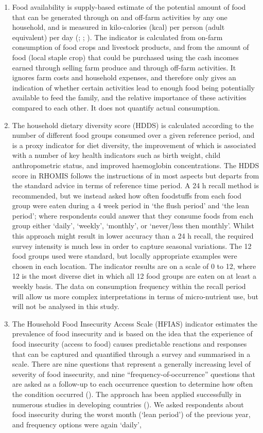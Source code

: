 \begin{enumerate}[label=\arabic*., start = 1]
\item Food availability is supply-based estimate of the potential amount of food that can be generated through on and off-farm activities by any one household, and is measured in kilo-calories (kcal) per person (adult equivalent) per day (\citealp{Frelat2016458}; \citealp{Ritzema2017}; \citealp{VanWijk2014a}). The indicator is calculated from on-farm consumption of food crops and livestock products, and from the amount of food (local staple crop) that could be purchased using the cash incomes earned through selling farm produce and through off-farm activities. It ignores farm costs and household expenses, and therefore only gives an indication of whether certain activities lead to enough food being potentially available to feed the family, and the relative importance of these activities compared to each other. It does not quantify actual consumption.
\item The household dietary diversity score (HDDS) is calculated according to the number of different food groups consumed over a given reference period, and is a proxy indicator for diet diversity, the improvement of which is associated with a number of key health indicators such as birth weight, child anthropometric status, and improved haemoglobin concentrations. The HDDS score in RHOMIS follows the instructions of \citet{Swindale2006} in most aspects but departs from the standard advice in terms of reference time period. A 24 h recall method is recommended, but we instead asked how often foodstuffs from each food group were eaten during a 4 week period in `the flush period' and `the lean period'; where respondents could answer that they consume foods from each group either `daily', `weekly', `monthly', or `never/less then monthly'. Whilst this approach might result in lower accuracy than a 24 h recall, the required survey intensity is much less in order to capture seasonal variations. The 12 food groups used were standard, but locally appropriate examples were chosen in each location. The indicator results are on a scale of 0 to 12, where 12 is the most diverse diet in which all 12 food groups are eaten on at least a weekly basis. The data on consumption frequency within the recall period will allow us more complex interpretations in terms of micro-nutrient use, but will not be analysed in this study.
\item The Household Food Insecurity Access Scale (HFIAS) indicator estimates the prevalence of food insecurity and is based on the idea that the experience of food insecurity (access to food) causes predictable reactions and responses that can be captured and quantiﬁed through a survey and summarised in a scale. There are nine questions that represent a generally increasing level of severity of food insecurity, and nine “frequency-of-occurrence” questions that are asked as a follow-up to each occurrence question to determine how often the condition occurred (\citealp{Coates2007}). The approach has been applied successfully in numerous studies in developing countries (\citealp{Coates2006}). We asked respondents about food insecurity during the worst month (`lean period') of the previous year, and frequency options were again `daily',

\end{enumerate}
